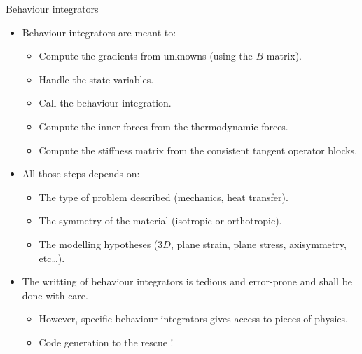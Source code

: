 \documentclass{beamer}
\begin{document}
\begin{frame}{Behaviour
    integrators}
  \begin{itemize}
    \item Behaviour integrators are meant to:
    \begin{itemize}
      \item Compute the gradients from unknowns (using the
      \(B\) matrix).
      \item Handle the state variables.
      \item Call the behaviour integration.
      \item Compute the inner forces from the thermodynamic
      forces.
      \item Compute the stiffness matrix from the consistent
      tangent operator blocks.
    \end{itemize}
  \end{itemize}
  \begin{itemize}
    \item All those steps depends on:
    \begin{itemize}
      \item The type of problem described (mechanics, heat
      transfer).
      \item The symmetry of the material (isotropic or
      orthotropic).
      \item The modelling hypotheses (\(3D\), plane strain,
      plane stress, axisymmetry, etc\ldots).
    \end{itemize}
  \end{itemize}
  \begin{itemize}
    \item The writting of behaviour integrators is tedious and
    error-prone and shall be done with care.
    \begin{itemize}
      \item However, specific behaviour integrators gives
      access to pieces of physics.
      \item Code generation to the rescue !
    \end{itemize}
  \end{itemize}
\end{frame}
\end{document}
